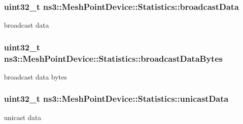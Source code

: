 \subsubsection[{\texorpdfstring{broadcast\+Data}{broadcastData}}]{\setlength{\rightskip}{0pt plus 5cm}uint32\+\_\+t ns3\+::\+Mesh\+Point\+Device\+::\+Statistics\+::broadcast\+Data}\hypertarget{structns3_1_1MeshPointDevice_1_1Statistics_a63f262171b72e2841c8d8020962aebbe}{}\label{structns3_1_1MeshPointDevice_1_1Statistics_a63f262171b72e2841c8d8020962aebbe}


broadcast data 

\subsubsection[{\texorpdfstring{broadcast\+Data\+Bytes}{broadcastDataBytes}}]{\setlength{\rightskip}{0pt plus 5cm}uint32\+\_\+t ns3\+::\+Mesh\+Point\+Device\+::\+Statistics\+::broadcast\+Data\+Bytes}\hypertarget{structns3_1_1MeshPointDevice_1_1Statistics_ae43272e72d10a3ff03be29fb86ed1969}{}\label{structns3_1_1MeshPointDevice_1_1Statistics_ae43272e72d10a3ff03be29fb86ed1969}


broadcast data bytes 

\subsubsection[{\texorpdfstring{unicast\+Data}{unicastData}}]{\setlength{\rightskip}{0pt plus 5cm}uint32\+\_\+t ns3\+::\+Mesh\+Point\+Device\+::\+Statistics\+::unicast\+Data}\hypertarget{structns3_1_1MeshPointDevice_1_1Statistics_a756dc2e1a805c69edad8e6cf70dcc821}{}\label{structns3_1_1MeshPointDevice_1_1Statistics_a756dc2e1a805c69edad8e6cf70dcc821}


unicast data 

